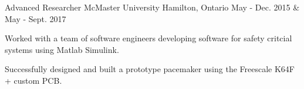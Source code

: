 \begin{cventries}
  \cventry
    {Advanced Researcher} %
    {McMaster University} %
    {Hamilton, Ontario} %
    {May - Dec. 2015 \& May - Sept. 2017} %
    {
      \begin{cvitems} %
        \item {Worked with a team of software engineers developing software for safety critcial systems using Matlab Simulink.}
        \item {Successfully designed and built a prototype pacemaker using the Freescale K64F + custom PCB.}
      \end{cvitems}
    }



\end{cventries}
